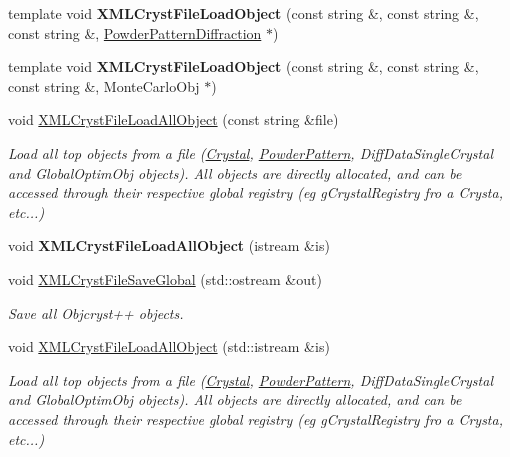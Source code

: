 \begin{DoxyCompactItemize}
\item 
\mbox{\label{namespace_obj_cryst_a0978f6313d5b7688c1a98fb3e588aa26}} 
template void {\bfseries X\+M\+L\+Cryst\+File\+Load\+Object} (const string \&, const string \&, const string \&, \mbox{\hyperlink{class_obj_cryst_1_1_powder_pattern_diffraction}{Powder\+Pattern\+Diffraction}} $\ast$)
\item 
\mbox{\label{namespace_obj_cryst_ab0c7004601cbec2eb7d05f24aaf53cde}} 
template void {\bfseries X\+M\+L\+Cryst\+File\+Load\+Object} (const string \&, const string \&, const string \&, Monte\+Carlo\+Obj $\ast$)
\item 
void \mbox{\hyperlink{namespace_obj_cryst_a9190567cd56ccba47cc6ce8e1336a6df}{X\+M\+L\+Cryst\+File\+Load\+All\+Object}} (const string \&file)
\begin{DoxyCompactList}\small\item\em Load all \textquotesingle{}top\textquotesingle{} objects from a file (\mbox{\hyperlink{class_obj_cryst_1_1_crystal}{Crystal}}, \mbox{\hyperlink{class_obj_cryst_1_1_powder_pattern}{Powder\+Pattern}}, Diff\+Data\+Single\+Crystal and Global\+Optim\+Obj objects). All objects are directly allocated, and can be accessed through their respective global registry (eg g\+Crystal\+Registry fro a Crysta, etc...) \end{DoxyCompactList}\item 
\mbox{\label{namespace_obj_cryst_a59c1b9f1d68239a22ce5b188c5f9c4ab}} 
void {\bfseries X\+M\+L\+Cryst\+File\+Load\+All\+Object} (istream \&is)
\item 
void \mbox{\hyperlink{namespace_obj_cryst_a924609aaf5852df641479745d5482747}{X\+M\+L\+Cryst\+File\+Save\+Global}} (std\+::ostream \&out)
\begin{DoxyCompactList}\small\item\em Save all Objcryst++ objects. \end{DoxyCompactList}\item 
void \mbox{\hyperlink{namespace_obj_cryst_a43fd80ec699bfaa352ac950dd95a7c78}{X\+M\+L\+Cryst\+File\+Load\+All\+Object}} (std\+::istream \&is)
\begin{DoxyCompactList}\small\item\em Load all \textquotesingle{}top\textquotesingle{} objects from a file (\mbox{\hyperlink{class_obj_cryst_1_1_crystal}{Crystal}}, \mbox{\hyperlink{class_obj_cryst_1_1_powder_pattern}{Powder\+Pattern}}, Diff\+Data\+Single\+Crystal and Global\+Optim\+Obj objects). All objects are directly allocated, and can be accessed through their respective global registry (eg g\+Crystal\+Registry fro a Crysta, etc...) \end{DoxyCompactList}\item 

\end{DoxyCompactItemize}
